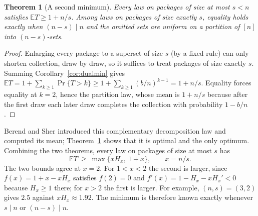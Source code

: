 \documentclass[11pt,a4paper]{article}
\newtheorem{theorem}{Theorem}[section]
\theoremstyle{remark}
\newcommand{\E}{\mathbb E}
\begin{document}
\begin{theorem}[A second minimum]\label{thm:dualmin}
Every law on packages of size at most $s<n$ satisfies $\E T\ge1+n/s$. Among laws on packages of size exactly $s$, equality holds exactly when $(n-s)\mid n$ and the omitted sets are uniform on a partition of $[n]$ into $(n-s)$-sets.
\end{theorem}
\begin{proof}
Enlarging every package to a superset of size $s$ (by a fixed rule) can only shorten collection, draw by draw, so it suffices to treat packages of size exactly $s$. Summing Corollary~\ref{cor:dualmin} gives $\E T=1+\sum_{k\ge1}\Pr\{T>k\}\ge1+\sum_{k\ge1}(b/n)^{k-1}=1+n/s$. Equality forces equality at $k=2$, hence the partition law, whose mean is $1+n/s$ because after the first draw each later draw completes the collection with probability $1-b/n$.
\end{proof}

Berend and Sher \cite{sher} introduced this complementary decomposition law and computed its mean; Theorem~\ref{thm:dualmin} shows that it is optimal and the only optimum. Combining the two theorems, every law on packages of size at most $s$ has
\[
 \E T\ \ge\ \max\{xH_x,\ 1+x\},\qquad x=n/s .
\]
The two bounds agree at $x=2$. For $1<x<2$ the second is larger, since $f(x)=1+x-xH_x$ satisfies $f(2)=0$ and $f'(x)=1-H_x-xH_x'<0$ because $H_x\ge1$ there; for $x>2$ the first is larger. For example, $(n,s)=(3,2)$ gives $2.5$ against $xH_x\approx1.92$. The minimum is therefore known exactly whenever $s\mid n$ or $(n-s)\mid n$.
\end{document}
